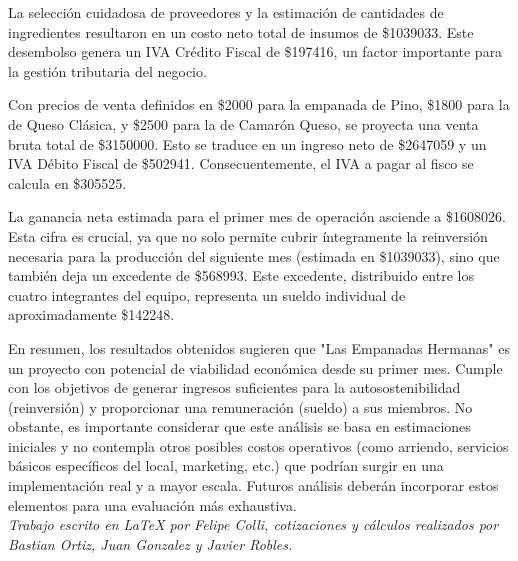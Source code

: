 \documentclass[12pt]{article}
\begin{document}
La selección cuidadosa de proveedores y la estimación de cantidades de ingredientes resultaron en un costo neto total de insumos de \$\num{1039033}. Este desembolso genera un IVA Crédito Fiscal de \$\num{197416}, un factor importante para la gestión tributaria del negocio.

Con precios de venta definidos en \$\num{2000} para la empanada de Pino, \$\num{1800} para la de Queso Clásica, y \$\num{2500} para la de Camarón Queso, se proyecta una venta bruta total de \$\num{3150000}. Esto se traduce en un ingreso neto de \$\num{2647059} y un IVA Débito Fiscal de \$\num{502941}. Consecuentemente, el IVA a pagar al fisco se calcula en \$\num{305525}.

La ganancia neta estimada para el primer mes de operación asciende a \$\num{1608026}. Esta cifra es crucial, ya que no solo permite cubrir íntegramente la reinversión necesaria para la producción del siguiente mes (estimada en \$\num{1039033}), sino que también deja un excedente de \$\num{568993}. Este excedente, distribuido entre los cuatro integrantes del equipo, representa un sueldo individual de aproximadamente \$\num{142248}.

En resumen, los resultados obtenidos sugieren que "Las Empanadas Hermanas" es un proyecto con potencial de viabilidad económica desde su primer mes. Cumple con los objetivos de generar ingresos suficientes para la autosostenibilidad (reinversión) y proporcionar una remuneración (sueldo) a sus miembros. No obstante, es importante considerar que este análisis se basa en estimaciones iniciales y no contempla otros posibles costos operativos (como arriendo, servicios básicos específicos del local, marketing, etc.) que podrían surgir en una implementación real y a mayor escala. Futuros análisis deberán incorporar estos elementos para una evaluación más exhaustiva. \\

\textit{Trabajo escrito en LaTeX por Felipe Colli, cotizaciones y cálculos realizados por Bastian Ortiz, Juan Gonzalez y Javier Robles.}
\end{document}
